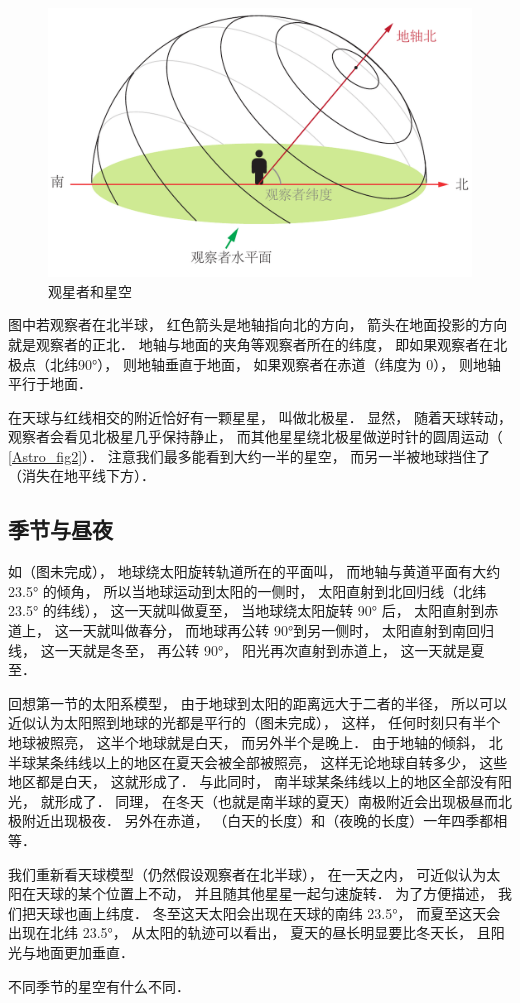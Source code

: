\begin{figure}[ht]
\centering
\includegraphics[width=11.5cm]{./figures/Astro3.pdf}
\caption{观星者和星空} \label{Astro_fig3}
\end{figure}

图中若观察者在北半球， 红色箭头是地轴指向北的方向， 箭头在地面投影的方向就是观察者的正北． 地轴与地面的夹角等观察者所在的纬度， 即如果观察者在北极点（北纬90°）， 则地轴垂直于地面， 如果观察者在赤道（纬度为 0）， 则地轴平行于地面．

在天球与红线相交的附近恰好有一颗星星， 叫做北极星． 显然， 随着天球转动， 观察者会看见北极星几乎保持静止， 而其他星星绕北极星做逆时针的圆周运动（ \autoref{Astro_fig2}）． 注意我们最多能看到大约一半的星空， 而另一半被地球挡住了（消失在地平线下方）．

\subsection{季节与昼夜}

如（图未完成）， 地球绕太阳旋转轨道所在的平面叫， 而地轴与黄道平面有大约 23.5° 的倾角， 所以当地球运动到太阳的一侧时， 太阳直射到北回归线（北纬 23.5° 的纬线）， 这一天就叫做夏至， 当地球绕太阳旋转 90° 后， 太阳直射到赤道上， 这一天就叫做春分， 而地球再公转 90°到另一侧时， 太阳直射到南回归线， 这一天就是冬至， 再公转 90°， 阳光再次直射到赤道上， 这一天就是夏至．

回想第一节的太阳系模型， 由于地球到太阳的距离远大于二者的半径， 所以可以近似认为太阳照到地球的光都是平行的（图未完成）， 这样， 任何时刻只有半个地球被照亮， 这半个地球就是白天， 而另外半个是晚上． 由于地轴的倾斜， 北半球某条纬线以上的地区在夏天会被全部被照亮， 这样无论地球自转多少， 这些地区都是白天， 这就形成了． 与此同时， 南半球某条纬线以上的地区全部没有阳光， 就形成了． 同理， 在冬天（也就是南半球的夏天）南极附近会出现极昼而北极附近出现极夜． 另外在赤道， （白天的长度）和（夜晚的长度）一年四季都相等．


我们重新看天球模型（仍然假设观察者在北半球）， 在一天之内， 可近似认为太阳在天球的某个位置上不动， 并且随其他星星一起匀速旋转． 为了方便描述， 我们把天球也画上纬度． 冬至这天太阳会出现在天球的南纬 23.5°， 而夏至这天会出现在北纬 23.5°， 从太阳的轨迹可以看出， 夏天的昼长明显要比冬天长， 且阳光与地面更加垂直． 

不同季节的星空有什么不同．










